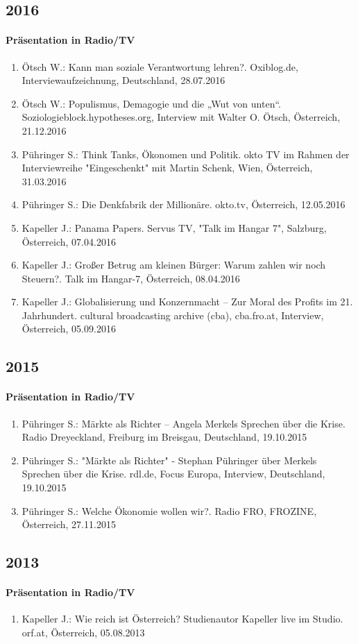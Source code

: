 \subsection*{2016}
\paragraph{Präsentation in Radio/TV}
\begin{enumerate}
	\item Ötsch W.: Kann man soziale Verantwortung lehren?. Oxiblog.de, Interviewaufzeichnung, Deutschland, 28.07.2016
	\item Ötsch W.: Populismus, Demagogie und die „Wut von unten“. Soziologieblock.hypotheses.org, Interview mit Walter O. Ötsch, Österreich, 21.12.2016
	\item Pühringer S.: Think Tanks, Ökonomen und Politik. okto TV im Rahmen der Interviewreihe "Eingeschenkt" mit Martin Schenk, Wien, Österreich, 31.03.2016
	\item Pühringer S.: Die Denkfabrik der Millionäre. okto.tv, Österreich, 12.05.2016
	\item Kapeller J.: Panama Papers. Servus TV, "Talk im Hangar 7", Salzburg, Österreich, 07.04.2016
	\item Kapeller J.: Großer Betrug am kleinen Bürger: Warum zahlen wir noch Steuern?. Talk im Hangar-7, Österreich, 08.04.2016
	\item Kapeller J.: Globalisierung und Konzernmacht – Zur Moral des Profits im 21. Jahrhundert. cultural broadcasting archive (cba), cba.fro.at, Interview, Österreich, 05.09.2016
\end{enumerate}
\subsection*{2015}
\paragraph{Präsentation in Radio/TV}
\begin{enumerate}
	\item Pühringer S.: Märkte als Richter – Angela Merkels Sprechen über die Krise. Radio Dreyeckland, Freiburg im Breisgau, Deutschland, 19.10.2015
	\item Pühringer S.: "Märkte als Richter" - Stephan Pühringer über Merkels Sprechen über die Krise. rdl.de, Focus Europa, Interview, Deutschland, 19.10.2015
	\item Pühringer S.: Welche Ökonomie wollen wir?. Radio FRO, FROZINE, Österreich, 27.11.2015
\end{enumerate}
\subsection*{2013}
\paragraph{Präsentation in Radio/TV}
\begin{enumerate}
	\item Kapeller J.: Wie reich ist Österreich? Studienautor Kapeller live im Studio. orf.at, Österreich, 05.08.2013
\end{enumerate}
